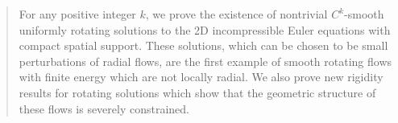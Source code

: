 \documentclass[11pt,oneside]{amsart}
\theoremstyle{definition}
\def\RR{\mathbb{R}}
\numberwithin{equation}{section}
\begin{document}
%
%
\begin{abstract}  
For any positive integer $k$, we prove the existence of nontrivial $C^k$-smooth uniformly rotating solutions to the 2D incompressible Euler equations with compact spatial support. These solutions, which can be chosen to be small perturbations of radial flows, are the first example of smooth rotating flows with finite energy which are not locally radial. We also prove new rigidity results for rotating solutions which show that the geometric structure of these flows is severely constrained.

\end{abstract}

 

\maketitle

 
\end{document}
